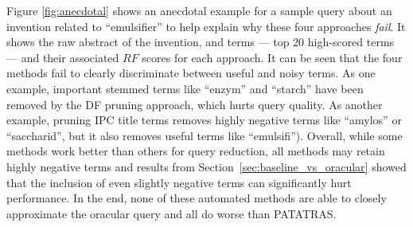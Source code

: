 
\vspace*{0.5mm}
Figure \ref{fig:anecdotal} shows an anecdotal example for a sample query about an invention related to ``emulsifier'' to help explain why these four approaches \emph{fail}. It shows the raw abstract of the invention, and terms --- top 20 high-scored terms --- and their associated $\mathit{RF}$ scores for each approach. 
It can be seen that the four methods fail to clearly discriminate between useful and noisy terms. As one example, important stemmed terms like ``enzym'' and ``starch'' have been removed by the DF pruning approach, which hurts query quality.  As another example, pruning IPC title terms removes highly negative terms like ``amylos'' or ``saccharid'', but it also removes useful terms like ``emulsifi'').  
  Overall, while some methods work better than others for query reduction, all methods may retain highly negative terms and results from Section~\ref{sec:baseline_vs_oracular} showed that the inclusion of even slightly negative terms can significantly hurt performance.  In the end, none of these automated methods are able to closely approximate the oracular query and all do worse than PATATRAS.
 


